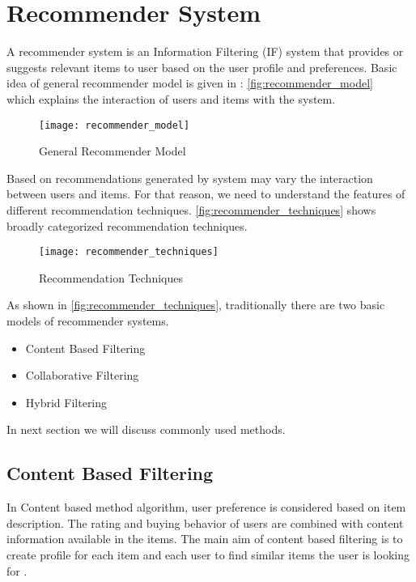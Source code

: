 \section{Recommender System}
A recommender system is an Information Filtering (IF) system that provides or suggests relevant items to user based on the user profile and preferences. Basic idea of general recommender model is given in : \autoref{fig:recommender_model} \\ which explains the interaction of users and items with the system.

\begin{figure}[H]
	\centering
	\texttt{[image: recommender\_model]}
	\caption{General Recommender Model \cite{3}}
	\label{fig:recommender_model}
\end{figure}

\noindent Based on recommendations generated by system may vary the interaction between users and items. For that reason, we need to understand the features of different recommendation techniques. \autoref{fig:recommender_techniques} shows broadly categorized recommendation techniques.

\begin{figure}[H]
	\centering
	\texttt{[image: recommender\_techniques]}
	\caption{Recommendation Techniques \cite{33}}
	\label{fig:recommender_techniques}
\end{figure}


\noindent As shown in \autoref{fig:recommender_techniques}, traditionally there are two basic models of recommender systems. \begin{itemize} \item Content Based Filtering \item Collaborative Filtering \item Hybrid Filtering \end{itemize}
In next section we will discuss commonly used methods.
\pagebreak

\subsection{Content Based Filtering}
In Content based method algorithm, user preference is considered based on item description. The rating and buying behavior of users are combined with content information available in the items. The main aim of content based filtering is to create profile for each item and each user to find similar items the user is looking for \cite{6}.
\\

